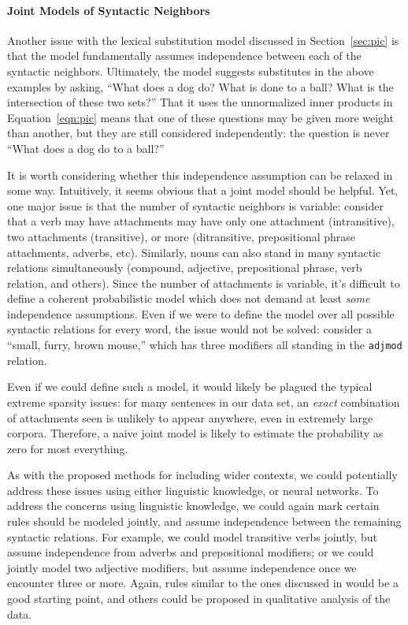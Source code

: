 \documentclass[letterpaper]{article}
\begin{document}
\paragraph{Joint Models of Syntactic Neighbors}

Another issue with the lexical substitution model discussed in Section~\ref{sec:pic}
is that the model fundamentally assumes independence between each of the syntactic
neighbors. Ultimately, the model suggests substitutes in the above examples by
asking, ``What does a dog do? What is done to a ball? What is the intersection
of these two sets?'' That it uses the unnormalized inner products in Equation~\ref{eqn:pic}
means that one of these questions may be given more weight than another, but they
are still considered independently: the question is never ``What does a dog do
to a ball?''

It is worth considering whether this independence assumption can be relaxed
in some way. Intuitively, it seems obvious that a joint model should be helpful.
Yet, one major issue is that the number of syntactic neighbors is variable:
consider that a verb may have attachments may have only one attachment (intransitive),
two attachments (transitive), or more (ditransitive, prepositional phrase attachments,
adverbs, etc). Similarly, nouns can also stand in many syntactic relations
simultaneously (compound, adjective, prepositional phrase, verb relation, and
others). Since the number of attachments is variable, it's difficult to define
a coherent probabilistic model which does not demand at least {\em some}
independence assumptions. Even if we were to define the model over all possible
syntactic relations for every word, the issue would not be solved: consider
a ``small, furry, brown mouse,'' which has three modifiers all standing
in the {\tt adjmod} relation.

Even if we could define such a model, it would likely be plagued the typical
extreme sparsity issues: for many sentences in our data set, an {\em exact}
combination of attachments seen is unlikely to appear anywhere, even in
extremely large corpora. Therefore, a naive joint model is likely to estimate
the probability as zero for most everything.

As with the proposed methods for including wider contexts, we could potentially
address these issues using either linguistic knowledge, or neural networks.  To
address the concerns using linguistic knowledge, we could again mark certain
rules should be modeled jointly, and assume independence between the remaining
syntactic relations. For example, we could model transitive verbs jointly, but
assume independence from adverbs and prepositional modifiers; or we could
jointly model two adjective modifiers, but assume independence once we
encounter three or more. Again, rules similar to the ones discussed in
 would be a good starting point, and others could be
proposed in qualitative analysis of the data.
\end{document}

